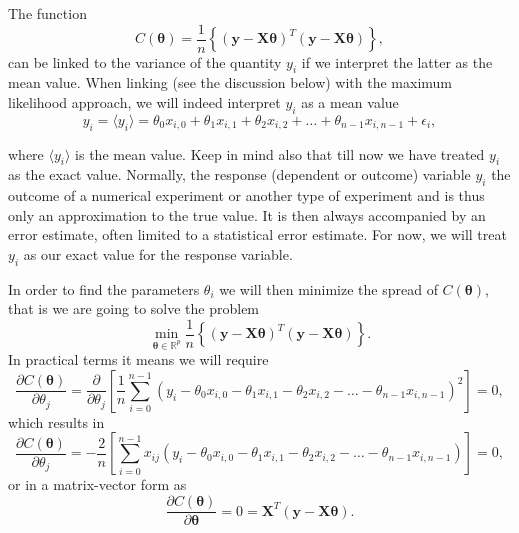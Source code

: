 \documentclass[%
oneside,                 %
final,                   %
10pt]{article}
\newenvironment{block_mdfboxadmon}[1][]{
\begin{block_mdfboxmdframed}[frametitle=#1]
}
{
\end{block_mdfboxmdframed}
}
\begin{document}
\begin{block_mdfboxadmon}[]

The function 
\[
C(\bm{\theta})=\frac{1}{n}\left\{\left(\bm{y}-\bm{X}\bm{\theta}\right)^T\left(\bm{y}-\bm{X}\bm{\theta}\right)\right\},
\]
can be linked to the variance of the quantity $y_i$ if we interpret the latter as the mean value. 
When linking (see the discussion below) with the maximum likelihood approach, we will indeed interpret $y_i$ as a mean value
\[
y_{i}=\langle y_i \rangle = \theta_0x_{i,0}+\theta_1x_{i,1}+\theta_2x_{i,2}+\dots+\theta_{n-1}x_{i,n-1}+\epsilon_i,
\]

where $\langle y_i \rangle$ is the mean value. Keep in mind also that
till now we have treated $y_i$ as the exact value. Normally, the
response (dependent or outcome) variable $y_i$ the outcome of a
numerical experiment or another type of experiment and is thus only an
approximation to the true value. It is then always accompanied by an
error estimate, often limited to a statistical error estimate. For now, we
will treat $y_i$ as our exact value for the response variable.

In order to find the parameters $\theta_i$ we will then minimize the spread of $C(\bm{\theta})$, that is we are going to solve the problem
\[
{\displaystyle \min_{\bm{\theta}\in
{\mathbb{R}}^{p}}}\frac{1}{n}\left\{\left(\bm{y}-\bm{X}\bm{\theta}\right)^T\left(\bm{y}-\bm{X}\bm{\theta}\right)\right\}.
\]
In practical terms it means we will require
\[
\frac{\partial C(\bm{\theta})}{\partial \theta_j} = \frac{\partial }{\partial \theta_j}\left[ \frac{1}{n}\sum_{i=0}^{n-1}\left(y_i-\theta_0x_{i,0}-\theta_1x_{i,1}-\theta_2x_{i,2}-\dots-\theta_{n-1}x_{i,n-1}\right)^2\right]=0, 
\]
which results in
\[
\frac{\partial C(\bm{\theta})}{\partial \theta_j} = -\frac{2}{n}\left[ \sum_{i=0}^{n-1}x_{ij}\left(y_i-\theta_0x_{i,0}-\theta_1x_{i,1}-\theta_2x_{i,2}-\dots-\theta_{n-1}x_{i,n-1}\right)\right]=0, 
\]
or in a matrix-vector form as
\[
\frac{\partial C(\bm{\theta})}{\partial \bm{\theta}} = 0 = \bm{X}^T\left( \bm{y}-\bm{X}\bm{\theta}\right).  
\]
\end{block_mdfboxadmon} %




\end{document}
